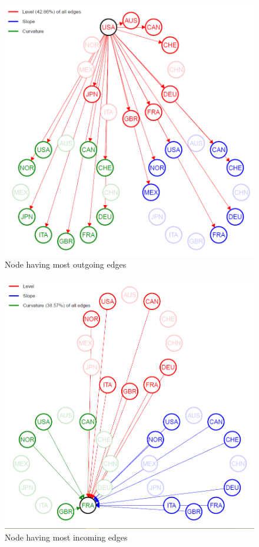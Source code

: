 \documentclass[12pt,bibliography=totoc]{article}
\begin{document}
\begin{figure}[H]

\includegraphics[width=13.5cm]{top_out}
\centering
\caption{Node having most outgoing edges}

\end{figure}

\begin{figure}[H]

\includegraphics[width=13.5cm]{top_in}
\centering
\caption{Node having most incoming edges}

\end{figure}
\end{document}
